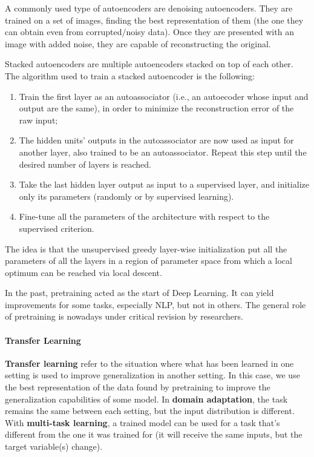A commonly used type of autoencoders are denoising autoencoders. They are trained on a set of images, finding the best representation of them (the one they can obtain even from corrupted/noisy data). Once they are presented with an image with added noise, they are capable of reconstructing the original.

Stacked autoencoders are multiple autoencoders stacked on top of each other. The algorithm used to train a stacked autoencoder is the following:
\begin{enumerate}
    \item Train the first layer as an autoassociator (i.e., an autoecoder whose input and output are the same), in order to minimize the reconstruction error of the raw input;

    \item The hidden units' outputs in the autoassociator are now used as input for another layer, also trained to be an autoassociator. Repeat this step until the desired number of layers is reached.

    \item Take the last hidden layer output as input to a supervised layer, and initialize only its parameters (randomly or by supervised learning).

    \item Fine-tune all the parameters of the architecture with respect to the supervised criterion.
\end{enumerate}

The idea is that the unsupervised greedy layer-wise initialization put all the parameters of all the layers in a region of parameter space from which a local optimum can be reached via local descent.

In the past, pretraining acted as the start of Deep Learning. It can yield improvements for some tasks, especially NLP, but not in others. The general role of pretraining is nowadays under critical revision by researchers.

\paragraph{Transfer Learning}

\textbf{Transfer learning} refer to the situation where what has been learned in one setting is used to improve generalization in another setting. In this case, we use the best representation of the data found by pretraining to improve the generalization capabilities of some model. In \textbf{domain adaptation}, the task remains the same between each setting, but the input distribution is different. With \textbf{multi-task learning}, a trained model can be used for a task that's different from the one it was trained for (it will receive the same inputs, but the target variable(s) change).

